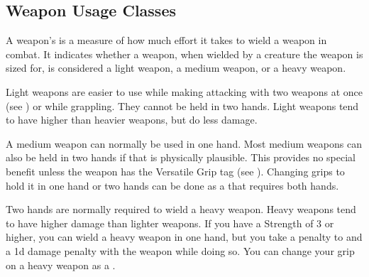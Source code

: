     \subsection{Weapon Usage Classes}\label{Weapon Usage Classes}
        A weapon's  is a measure of how much effort it takes to wield a weapon in combat.
        It indicates whether a weapon, when wielded by a creature the weapon is sized for, is considered a light weapon, a medium weapon, or a heavy weapon.


        \label{Light Weapons} Light weapons are easier to use while making attacking with two weapons at once (see ) or while grappling.
        They cannot be held in two hands.
        Light weapons tend to have higher  than heavier weapons, but do less damage.

         A medium weapon can normally be used in one hand.
        Most medium weapons can also be held in two hands if that is physically plausible.
        This provides no special benefit unless the weapon has the Versatile Grip tag (see ).
        Changing grips to hold it in one hand or two hands can be done as a  that requires both hands.

         Two hands are normally required to wield a heavy weapon.
        Heavy weapons tend to have higher damage than lighter weapons.
        If you have a Strength of 3 or higher, you can wield a heavy weapon in one hand, but you take a  penalty to  and a \minus1d damage penalty with the weapon while doing so.
        You can change your grip on a heavy weapon as a .


